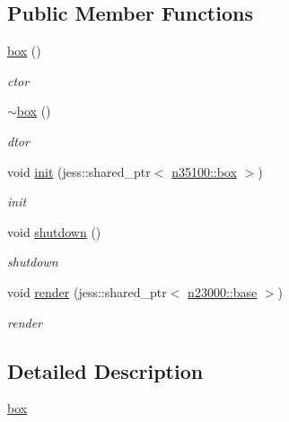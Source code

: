 \subsection*{Public Member Functions}
\begin{DoxyCompactItemize}
\item 
\hyperlink{classnebula_1_1content_1_1shape_1_1renderer_1_1box_af39f8b59be77155d02a1636b81b55da6}{box} ()
\begin{DoxyCompactList}\small\item\em ctor \item\end{DoxyCompactList}\item 
\hyperlink{classnebula_1_1content_1_1shape_1_1renderer_1_1box_afe87eb7519a8e048558a861d9cf2eb77}{$\sim$box} ()
\begin{DoxyCompactList}\small\item\em dtor \item\end{DoxyCompactList}\item 
void \hyperlink{classnebula_1_1content_1_1shape_1_1renderer_1_1box_a03626525c89e34ff6616512050c66ac8}{init} (jess::shared\_\-ptr$<$ \hyperlink{classnebula_1_1content_1_1shape_1_1admin_1_1box}{n35100::box} $>$)
\begin{DoxyCompactList}\small\item\em init \item\end{DoxyCompactList}\item 
void \hyperlink{classnebula_1_1content_1_1shape_1_1renderer_1_1box_a06588ac2d7fd76ec8589aaeab56b6389}{shutdown} ()
\begin{DoxyCompactList}\small\item\em shutdown \item\end{DoxyCompactList}\item 
void \hyperlink{classnebula_1_1content_1_1shape_1_1renderer_1_1box_a9f5273c402681016abf485410e89fa4b}{render} (jess::shared\_\-ptr$<$ \hyperlink{classnebula_1_1platform_1_1renderer_1_1base}{n23000::base} $>$)
\begin{DoxyCompactList}\small\item\em render \item\end{DoxyCompactList}\end{DoxyCompactItemize}


\subsection{Detailed Description}
\hyperlink{classnebula_1_1content_1_1shape_1_1renderer_1_1box}{box} 

